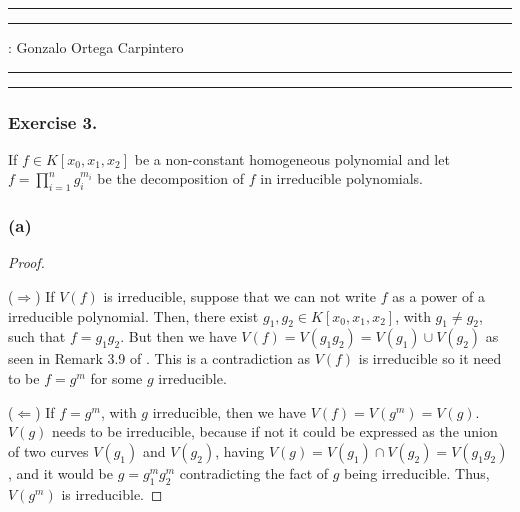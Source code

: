 \documentclass[11pt,a4paper]{article}
\begin{document}
\hrule\hrule
\vspace{1mm}


\vspace{1mm}

 : Gonzalo Ortega Carpintero
\vspace{2mm}

\hrule\hrule

\subsubsection*{Exercise 3.}

  If $ f \in K[x_0, x_1, x_2] $ be a non-constant homogeneous polynomial and let $ f = \prod_{i=1}^n g_i^{m_i} $ be the decomposition of $ f $ in irreducible polynomials.

\subsubsection*{(a)}
  \begin{proof} \

    \vspace{1mm}
    ($\Rightarrow$)
    If $ V(f) $ is irreducible, suppose that we can not write $ f $ as a power of a irreducible polynomial. Then, there exist $ g_1, g_2 \in K[x_0, x_1, x_2] $, with $ g_1 \neq g_2 $, such that $ f = g_1 g_2 $. But then we have $ V(f) = V(g_1 g_2) = V(g_1) \cup V(g_2) $ as seen in Remark 3.9 of \cite{gath}. This is a contradiction as $ V(f) $ is irreducible so it need to be $ f = g^m $ for some $g$ irreducible.

    \vspace{1mm}
    ($\Leftarrow$)
    If $ f = g^m $, with $ g $ irreducible, then we have $ V(f) = V(g^m) = V(g) $. $ V(g) $ needs to be irreducible, because if not it could be expressed as the union of two curves $ V(g_1) $ and $ V(g_2) $, having $ V(g) = V(g_1) \cap V(g_2) = V(g_1 g_2) $, and it would be $ g =  g_1^m g_2^m $ contradicting the fact of $ g $ being irreducible. Thus, $ V(g^m) $ is irreducible.
  \end{proof}
\end{document}
